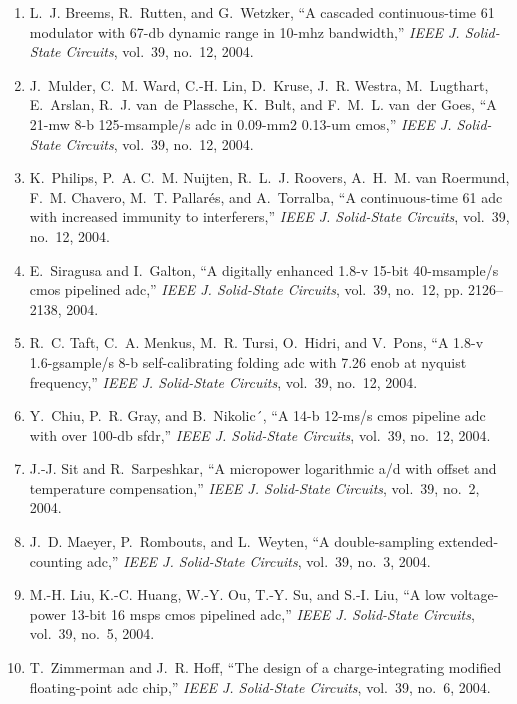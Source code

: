 \begin{enumerate}
\item
L.~J. Breems, R.~Rutten, and G.~Wetzker, ``A cascaded continuous-time 61
  modulator with 67-db dynamic range in 10-mhz bandwidth,'' \emph{{IEEE} J.
  Solid-State Circuits}, vol.~39, no.~12, 2004.

\item
J.~Mulder, C.~M. Ward, C.-H. Lin, D.~Kruse, J.~R. Westra, M.~Lugthart,
  E.~Arslan, R.~J. van~de Plassche, K.~Bult, and F.~M.~L. van~der Goes, ``A
  21-mw 8-b 125-msample/s adc in 0.09-mm2 0.13-um cmos,'' \emph{{IEEE} J.
  Solid-State Circuits}, vol.~39, no.~12, 2004.

\item
K.~Philips, P.~A. C.~M. Nuijten, R.~L.~J. Roovers, A.~H.~M. van Roermund, F.~M.
  Chavero, M.~T. Pallarés, and A.~Torralba, ``A continuous-time 61 adc with
  increased immunity to interferers,'' \emph{{IEEE} J. Solid-State Circuits},
  vol.~39, no.~12, 2004.

\item
E.~Siragusa and I.~Galton, ``A digitally enhanced 1.8-v 15-bit 40-msample/s
  cmos pipelined adc,'' \emph{{IEEE} J. Solid-State Circuits}, vol.~39, no.~12,
  pp. 2126--2138, 2004.

\item
R.~C. Taft, C.~A. Menkus, M.~R. Tursi, O.~Hidri, and V.~Pons, ``A 1.8-v
  1.6-gsample/s 8-b self-calibrating folding adc with 7.26 enob at nyquist
  frequency,'' \emph{{IEEE} J. Solid-State Circuits}, vol.~39, no.~12, 2004.

\item
Y.~Chiu, P.~R. Gray, and B.~Nikolic´, ``A 14-b 12-ms/s cmos pipeline adc with
  over 100-db sfdr,'' \emph{{IEEE} J. Solid-State Circuits}, vol.~39, no.~12,
  2004.

\item
J.-J. Sit and R.~Sarpeshkar, ``A micropower logarithmic a/d with offset and
  temperature compensation,'' \emph{{IEEE} J. Solid-State Circuits}, vol.~39,
  no.~2, 2004.

\item
J.~D. Maeyer, P.~Rombouts, and L.~Weyten, ``A double-sampling extended-counting
  adc,'' \emph{{IEEE} J. Solid-State Circuits}, vol.~39, no.~3, 2004.

\item
M.-H. Liu, K.-C. Huang, W.-Y. Ou, T.-Y. Su, and S.-I. Liu, ``A low
  voltage-power 13-bit 16 msps cmos pipelined adc,'' \emph{{IEEE} J.
  Solid-State Circuits}, vol.~39, no.~5, 2004.

\item
T.~Zimmerman and J.~R. Hoff, ``The design of a charge-integrating modified
  floating-point adc chip,'' \emph{{IEEE} J. Solid-State Circuits}, vol.~39,
  no.~6, 2004.


\end{enumerate}
